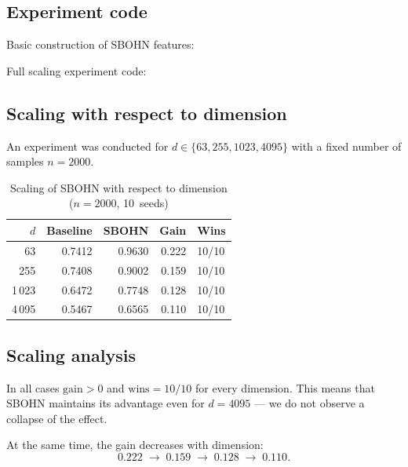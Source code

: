 \documentclass[11pt,a4paper]{report}
\begin{document}
\subsection{Experiment code}

Basic construction of SBOHN features:

\noindent{}


Full scaling experiment code:

\noindent{}



\subsection{Scaling with respect to dimension}

An experiment was conducted for $d \in \{63, 255, 1023, 4095\}$ with a fixed number of samples $n=2000$.

\begin{table}[H]
\centering
\caption{Scaling of SBOHN with respect to dimension ($n=2000$, 10~seeds)}
\label{tab:scale_d}
\begin{tabular}{rrrrl}
\toprule
$d$ & Baseline & SBOHN & Gain & Wins \\
\midrule
63    & 0.7412 & 0.9630 & 0.222 & 10/10 \\
255   & 0.7408 & 0.9002 & 0.159 & 10/10 \\
1\,023  & 0.6472 & 0.7748 & 0.128 & 10/10 \\
4\,095  & 0.5467 & 0.6565 & 0.110 & 10/10 \\
\bottomrule
\end{tabular}
\end{table}


\subsection{Scaling analysis}

In all cases $\text{gain} > 0$ and $\text{wins} = 10/10$ for every dimension. This means that SBOHN maintains its advantage even for $d = 4095$ --- we do not observe a collapse of the effect.

At the same time, the gain decreases with dimension:
\[
0.222 \;\rightarrow\; 0.159 \;\rightarrow\; 0.128 \;\rightarrow\; 0.110.
\]
\end{document}
